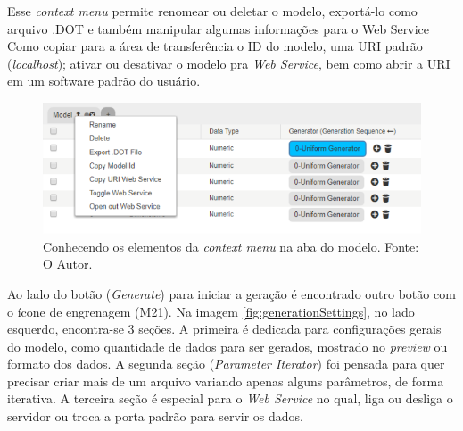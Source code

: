 \documentclass[
	12pt,				%
	openright,			%
	twoside,			%
	a4paper,			%
	english,			%
	brazil				%
	]{abntex2}
\begin{document}
		Esse \emph{context menu} permite renomear ou deletar o modelo, exportá-lo como arquivo .DOT e também manipular algumas informações para o Web Service Como
			copiar para a área de transferência o ID do modelo, uma URI padrão (\emph{localhost}); ativar ou desativar o modelo pra \emph{Web Service}, bem como abrir a URI em um software padrão do usuário.
		\begin{figure}[h]
			\centering
			\includegraphics[width=\linewidth]{./figures/prototipo/contextMenu.png}
			\caption{Conhecendo os elementos da \emph{context menu} na aba do modelo. Fonte: O Autor.}
			\label{fig:contextMenu}
		\end{figure}
		\par
		Ao lado do botão (\emph{Generate}) para iniciar a geração é encontrado outro botão com o ícone de engrenagem (M21).
		Na imagem \ref{fig:generationSettings}, no lado esquerdo, encontra-se 3 seções.
		A primeira é dedicada para configurações gerais do modelo, como quantidade de dados para ser gerados, mostrado no \emph{preview} ou formato dos dados.
		A segunda seção (\emph{Parameter Iterator}) foi pensada para quer precisar criar mais de um arquivo variando apenas alguns parâmetros, de forma iterativa.
		A terceira seção é especial para o \emph{Web Service} no qual, liga ou desliga o servidor ou troca a porta padrão para servir os dados.
		
\end{document}
